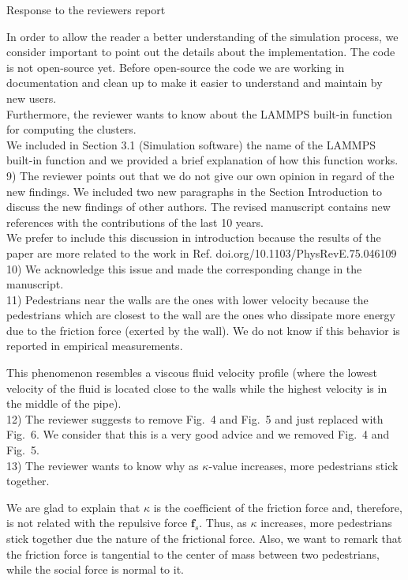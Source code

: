 \documentclass[a4paper,12pt]{letter}
\begin{document}
\begin{letter}{Response to the reviewers report}
{In order to allow the reader a better understanding of the simulation process, we 
consider important to point out the details about the implementation. The code is not open-source yet.
Before open-source the code we are working in documentation and clean up to make it easier to understand and maintain by new users.  \\

Furthermore, the reviewer wants to know about the LAMMPS built-in function for 
computing the clusters. \\

We included in Section 3.1 (Simulation software) the name of the LAMMPS 
built-in function and we provided a brief explanation of how this function works. \\ 

9) The reviewer points out that we do not give our own opinion in regard
of the new findings. We included two new paragraphs in the Section Introduction to discuss the new findings of other authors. The revised manuscript contains new references with the contributions of the last 10 years.\\

We prefer to include this discussion in introduction because the results of the paper are more related to the work in Ref.  doi.org/10.1103/PhysRevE.75.046109  \\

10) We acknowledge this issue and made the corresponding change in the 
manuscript.\\

11) Pedestrians near the walls are the ones with lower velocity because the pedestrians which are closest to the wall are the ones who dissipate more energy due to the friction force (exerted by the wall). We do not know if this behavior is reported in empirical measurements.  

This phenomenon resembles a viscous fluid velocity profile (where the lowest velocity of the fluid is located close to the walls while the highest velocity is in the middle of the pipe).  \\

12) The reviewer suggests to remove Fig.~4 and Fig.~5 and just replaced with Fig.~6. We consider that this is a very good advice and we removed Fig.~4 and Fig.~5.  \\

13) The reviewer wants to know why as $\kappa$-value increases, more 
pedestrians stick together.

We are glad to explain that $\kappa$ is the coefficient of the 
friction force and, therefore, is not related with the repulsive force 
$\mathbf{f}_s$. Thus, as $\kappa$ increases, more pedestrians stick 
together due the nature of the frictional force. Also, we want to remark that 
the friction force is tangential to the center of mass between two pedestrians, 
while the social force is normal to it. \\

}
\end{letter}
\end{document}
